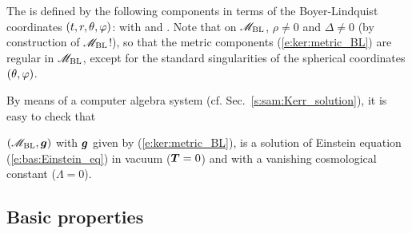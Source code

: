 The  is defined by the following
components in terms of the Boyer-Lindquist coordinates $(t,r,\theta,\varphi)$:
\be \label{e:ker:metric_BL}
\ee
with
\be \label{e:ker:def_rho2}
\ee
and
\be \label{e:ker:def_Delta}
     .
\ee
Note that on $\mathscr{M}_{\rm BL}$, $\rho\not=0$ and $\Delta\not=0$ (by construction
of $\mathscr{M}_{\rm BL}$!), so that the metric components (\ref{e:ker:metric_BL})
are regular in $\mathscr{M}_{\rm BL}$, except for the standard singularities of
the spherical coordinates $(\theta,\varphi)$.

By means of a computer algebra system (cf. Sec.~\ref{s:sam:Kerr_solution}),
it is easy to check that
\begin{greybox}
$\left(\mathscr{M}_{\rm BL},\bm{g}\right)$ with $\bm{g}$ given
by (\ref{e:ker:metric_BL}), is a solution of Einstein equation (\ref{e:bas:Einstein_eq})
in vacuum ($\bm{T}=0$) and with a vanishing cosmological constant ($\Lambda=0$).
\end{greybox}

\subsection{Basic properties} \label{s:ker:basic_prop}

